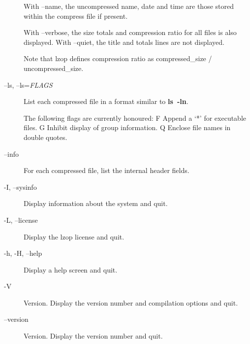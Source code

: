 \begin{description}
With --name, the uncompressed name, date and time
are those stored within the compress file if present.



With --verbose, the size totals and compression
ratio for all files is also displayed. With
--quiet, the title and totals lines are not displayed.



Note that lzop defines compression ratio
as compressed\_size / uncompressed\_size.


\item[--ls, --ls=\textit{FLAGS}] \mbox{}

List each compressed file in a format similar to \textbf{ls~-ln}.



The following flags are currently honoured:
  F  Append a `*' for executable files.
  G  Inhibit display of group information.
  Q  Enclose file names in double quotes.


\item[--info] \mbox{}

For each compressed file, list the internal header fields.


\item[-I, --sysinfo] \mbox{}

Display information about the system and quit.


\item[-L, --license] \mbox{}

Display the lzop license and quit.


\item[-h, -H, --help] \mbox{}

Display a help screen and quit.


\item[-V] \mbox{}

Version. Display the version number and compilation
options and quit.


\item[--version] \mbox{}

Version. Display the version number and quit.

\end{description}
